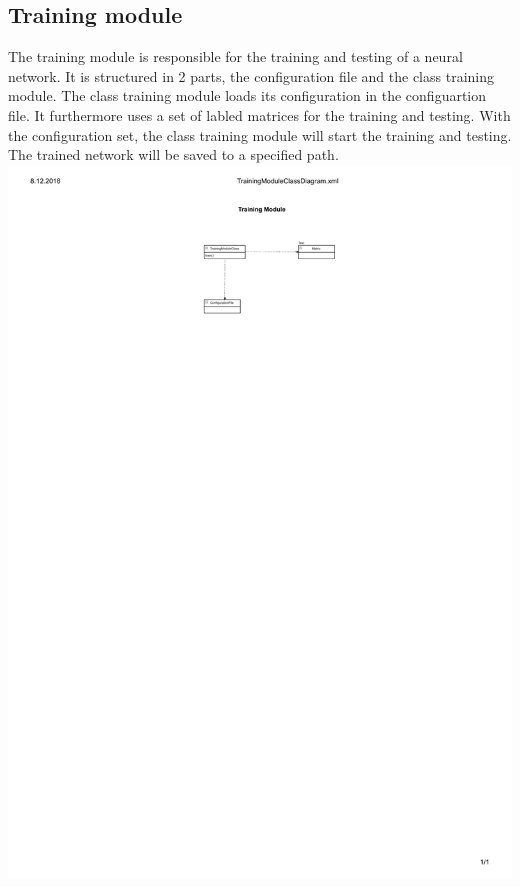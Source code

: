 \documentclass[parskip=full]{scrartcl}
\begin{document}
\subsection{Training module}
The training module is responsible for the training and testing of a neural network. It is structured in 2 parts, the configuration file and the class training module. The class training module loads its configuration in the configuartion file. It furthermore uses a set of labled matrices for the training and testing. With the configuration set, the class training module will start the training and testing. The trained network will be saved to a specified path.
%
\includegraphics{ClassDiagrams/PDF/TrainingModuleClassDiagram.pdf}
\end{document}
